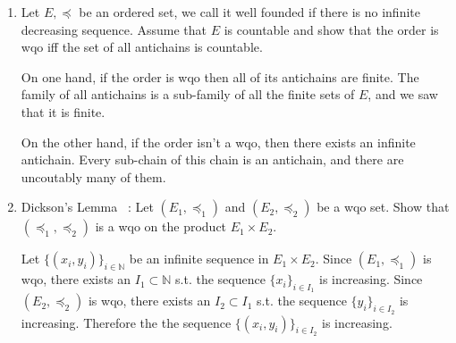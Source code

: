\documentclass[a4paper,11pt]{exam}
\newcommand{\N}{\mathbb{N}}
\begin{document}
\begin{questions}
\begin{enumerate}
\begin{solution}
				(\textit{def3}) $\Rightarrow$ (\textit{def1})~:
				We color the set $F = \{ (x_i,x_j), i<j \}$ as follows~:
				\begin{itemize}
					\item $(x_i,x_j)$ is colored red if $x_i \preccurlyeq x_j$,
					\item $(x_i,x_j)$ is colored green if $x_j \preccurlyeq x_i$ and
					$x_i \neq x_j$,
					\item $(x_i,x_j)$ is colored blue if $x_i$ and $x_j$ are incomparable.
				\end{itemize}
				By Ramsey's theorem there is an infinite set $I
				\subset \N$ of color $c$ s.t.~: $\forall i,j \in I, i<j,
				(x_i,x_j)$ is colored in $c$.
				If $c$ is the blue color, $(x_i)_{i \in I}$ is an antichain, which is impossible.
				If $c$ is the green color, $(x_i)_{i \in I}$ is a decresing sequence, which is impossible.
				Therefore $c$ is the red color, and $(x_i)_{i \in I}$ is an increasing sequence.
			\end{solution}
			
			\item Let $E,\preccurlyeq$ be an ordered set, we call it well founded if there is no infinite decreasing sequence. Assume that $E$ is countable and show that the order is wqo iff the set of all antichains is countable.
			
			\begin{solution}
				On one hand, if the order is wqo then all of its antichains are finite. The family of all antichains is a sub-family of all the finite sets of $E$, and we saw that it is finite.
				
				On the other hand, if the order isn't a wqo, then there exists an infinite antichain. Every sub-chain of this chain is an antichain, and there are uncoutably many of them. 
				
			\end{solution}
			
			\item Dickson's Lemma ~:
			Let $(E_1, \preccurlyeq_1)$  and $(E_2, \preccurlyeq_2)$ be a wqo set.
			Show that $ (\preccurlyeq_1, \preccurlyeq_2) $ is a wqo on the product $E_1\times E_2$. 
			
			\begin{solution}
				Let $\{(x_i,y_i)\}_{i\in\N}$ be an infinite sequence in $E_1\times E_2$. 
				Since $(E_1, \preccurlyeq_1)$ is wqo, there exists an $I_1 \subset \N$ s.t. the sequence $\{x_i\}_{i \in I_1}$ is increasing. Since $(E_2, \preccurlyeq_2)$ is wqo, there exists an $I_2 \subset I_1$ s.t. the sequence $\{y_i\}_{i \in I_2}$ is increasing. Therefore the the sequence $\{(x_i,y_i)\}_{i \in I_2}$ is increasing.
				

\end{solution}
\end{enumerate}
\end{questions}
\end{document}
